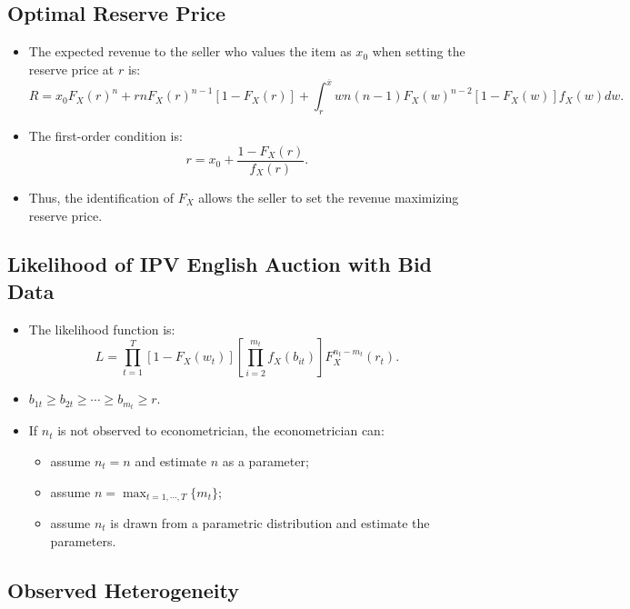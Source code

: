 \documentclass[
]{book}
\providecommand{\tightlist}{%
  \setlength{\itemsep}{0pt}\setlength{\parskip}{0pt}}
\begin{document}
\hypertarget{optimal-reserve-price}{%
\subsection{Optimal Reserve Price}\label{optimal-reserve-price}}

\begin{itemize}
\tightlist
\item
  The expected revenue to the seller who values the item as \(x_0\) when setting the reserve price at \(r\) is:
  \[
  R = x_0 F_X(r)^n + r n F_X(r)^{n - 1}[1 - F_X(r)] + \int_r^{\overline{x}} w n(n - 1)F_X(w)^{n - 2}[1 - F_X(w)] f_X(w) dw.
  \]
\item
  The first-order condition is:
  \[
  r = x_0 + \frac{1 - F_X(r)}{f_X(r)}.
  \]
\item
  Thus, the identification of \(F_X\) allows the seller to set the revenue maximizing reserve price.
\end{itemize}

\hypertarget{likelihood-of-ipv-english-auction-with-bid-data}{%
\subsection{Likelihood of IPV English Auction with Bid Data}\label{likelihood-of-ipv-english-auction-with-bid-data}}

\begin{itemize}
\tightlist
\item
  The likelihood function is:
  \[
  L = \prod_{t = 1}^T [1 - F_X(w_t)] \left[ \prod_{i = 2}^{m_t} f_X(b_{it}) \right] F_X^{n_t - m_t}(r_t).
  \]
\item
  \(b_{1t} \ge b_{2t} \ge \cdots \ge b_{m_t} \ge r\).
\item
  If \(n_t\) is not observed to econometrician, the econometrician can:

  \begin{itemize}
  \tightlist
  \item
    assume \(n_t = n\) and estimate \(n\) as a parameter;
  \item
    assume \(n = \max_{t = 1, \cdots, T} \{m_t\}\);
  \item
    assume \(n_t\) is drawn from a parametric distribution and estimate the parameters.
  \end{itemize}
\end{itemize}

\hypertarget{observed-heterogeneity}{%
\subsection{Observed Heterogeneity}\label{observed-heterogeneity}}
\end{document}
